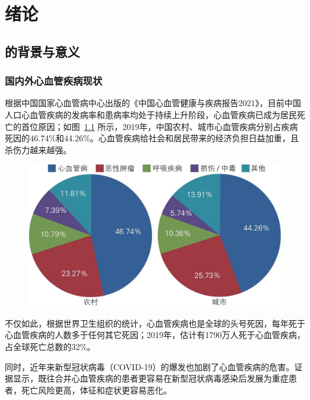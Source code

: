 

\chapter{绪论}\label{ch:intro}


\section{\app 的背景与意义}\label{sec:background}

\subsection{国内外心血管疾病现状}\label{subsec:disease}

根据中国国家心血管病中心出版的《中国心血管健康与疾病报告2021》\cite{Zhongguoxinxieguanjiankangyujibingbaogao20212022}，目前中国人口心血管疾病的发病率和患病率均处于持续上升阶段，心血管疾病已成为居民死亡的首位原因；如图~\ref{fig:2019-death} 所示，2019年，中国农村、城市心血管疾病分别占疾病死因的46.74\%和44.26\%。心血管疾病给社会和居民带来的经济负担日益加重，且杀伤力越来越强。

\begin{figure}[!ht]
    \centering
    \includegraphics[width=.7\textwidth]{../assets/2019-death}
    \label{fig:2019-death}
\end{figure}

不仅如此，根据世界卫生组织的统计\cite{CardiovascularDiseasesCVDs}，心血管疾病也是全球的头号死因，每年死于心血管疾病的人数多于任何其它死因；2019年，估计有1790万人死于心血管疾病，占全球死亡总数的32\%。

同时，近年来新型冠状病毒（COVID-19）的爆发也加剧了心血管疾病的危害。证据显示，既往合并心血管疾病的患者更容易在新型冠状病毒感染后发展为重症患者，死亡风险更高，体征和症状更容易恶化\cite{zhangXinxingguanzhuangbingdufeiyanyuxinxieguanjibing2020}。

